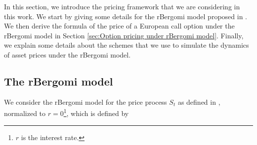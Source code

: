 In this section, we introduce the pricing framework that we are considering in this work. We start  by giving some details for the rBergomi model proposed in \cite{bayer2016pricing}. We then derive the formula of the price of a European call option under the rBergomi model in Section \ref{sec:Option pricing under rBergomi model}. Finally, we explain  some details about the schemes that we use to simulate the dynamics of asset prices under the rBergomi model.

\subsection{The rBergomi model}\label{sec:The rBergomi model}

We consider the rBergomi model for the price process $S_t$ as defined in  \cite{bayer2016pricing}, normalized to $r=0$\footnote{$r$ is the interest rate.}, which is defined by


